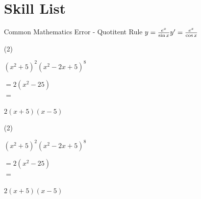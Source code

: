 \chapter{Skill List}

\clearpage
\setcounter{page}{1}








\begin{boxA}[styleDashedTitle]{Common Mathematics Error - Quotitent Rule}{
     $ y=\frac{e^x}{\sin{x}}  \\
	   y'= \frac{e^x}{\cos{x}}
	 $
}
\end{boxA}

\noindent
{}

\begin{mtask}[start=919](2)
    \task \begin{exercise}$(x^2+5)^2 (x^2-2x+5)^8$
              \begin{envSolution}
                 $ =2(x^2-25)   $\\ 
                 $ =$			 
                     \begin{shortsolution}
  	                    $ 2(x+5)(x-5)$
                     \end{shortsolution}
              \end{envSolution}%
          \end{exercise}

\end{mtask}


\clearpage
{}

\noindent\begin{tasks}[start=1](2)
    \task \begin{exercise}$(x^2+5)^2 (x^2-2x+5)^8$
              \begin{envSolution}
                 $ =2(x^2-25)   $\\ 
                 $ =$			 
                     \begin{shortsolution}
  	                    $ 2(x+5)(x-5)$
                     \end{shortsolution}
              \end{envSolution}%
          \end{exercise}
\end{tasks}


